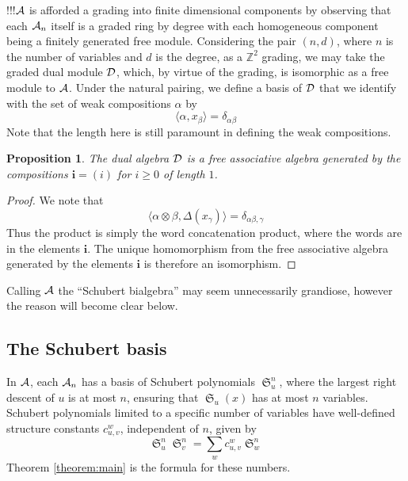 \documentclass{elsarticle}
\newtheorem{proposition}[lemma]{Proposition}
\theoremstyle{definition}
\theoremstyle{remark}
\numberwithin{equation}{subsection}
\DeclareMathOperator{\sch}{\mathfrak{S}}
\begin{document}
!!!$\mathcal{A}$ is afforded a grading into finite dimensional components by observing that each $\mathcal{A}_n$ itself is a graded ring by degree with each homogeneous component being a finitely generated free module. Considering the pair $(n, d)$, where $n$ is the number of variables and $d$ is the degree, as a $\mathbb{Z}^2$ grading, we may take the graded dual module $\mathcal{D}$, which, by virtue of the grading, is isomorphic as a free module to $\mathcal{A}$. Under the natural pairing, we define a basis of $\mathcal{D}$ that we identify with the set of weak compositions $\alpha$ by
$$\langle \alpha, x_\beta\rangle = \delta_{\alpha\beta}$$
Note that the length here is still paramount in defining the weak compositions.

\begin{proposition}
	The dual algebra $\mathcal{D}$ is a free associative algebra generated by the compositions $\mathbf{i}=(i)$ for $i\geq 0$ of length $1$.
\end{proposition}
\begin{proof}
	We note that
	$$\langle \alpha\otimes \beta, \Delta(x_\gamma)\rangle = \delta_{\alpha\beta,\gamma}$$
	Thus the product is simply the word concatenation product, where the words are in the elements $\mathbf{i}$. The unique homomorphism from the free associative algebra generated by the elements $\mathbf{i}$ is therefore an isomorphism.
\end{proof}



Calling $\mathcal{A}$ the ``Schubert bialgebra'' may seem unnecessarily grandiose, however the reason will become clear below.

\subsection{The Schubert basis}

\newcommand{\asch}[2]{\sch_{#1}^{#2}}

In $\mathcal{A}$, each $\mathcal{A}_n$ has a basis of Schubert polynomials $\asch{u}{n}$, where the largest right descent of $u$ is at most $n$, ensuring that $\sch_u(x)$ has at most $n$ variables. Schubert polynomials limited to a specific number of variables have well-defined structure constants $c_{u,v}^w$, independent of $n$, given by
$$\sch_u^n\sch_v^n = \sum_{w}c_{u,v}^w\sch_w^n$$
Theorem \ref{theorem:main} is the formula for these numbers.
\end{document}
